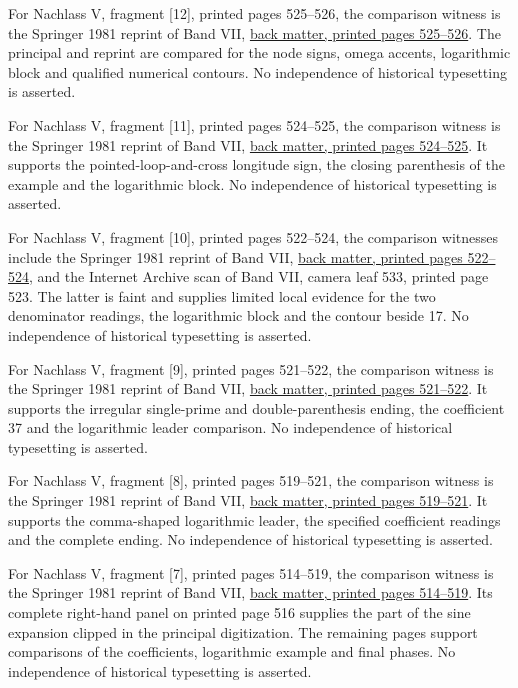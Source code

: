 For Nachlass V, fragment [12], printed pages 525–526, the comparison witness is the Springer 1981 reprint of Band VII, \href{https://link.springer.com/content/pdf/bbm:978-3-642-92478-1/1}{back matter, printed pages 525–526}. The principal and reprint are compared for the node signs, omega accents, logarithmic block and qualified numerical contours. No independence of historical typesetting is asserted.



For Nachlass V, fragment [11], printed pages 524–525, the comparison witness is the Springer 1981 reprint of Band VII, \href{https://link.springer.com/content/pdf/bbm:978-3-642-92478-1/1}{back matter, printed pages 524–525}. It supports the pointed-loop-and-cross longitude sign, the closing parenthesis of the example and the logarithmic block. No independence of historical typesetting is asserted.



For Nachlass V, fragment [10], printed pages 522–524, the comparison witnesses include the Springer 1981 reprint of Band VII, \href{https://link.springer.com/content/pdf/bbm:978-3-642-92478-1/1}{back matter, printed pages 522–524}, and the Internet Archive scan of Band VII, camera leaf 533, printed page 523. The latter is faint and supplies limited local evidence for the two denominator readings, the logarithmic block and the contour beside 17. No independence of historical typesetting is asserted.



For Nachlass V, fragment [9], printed pages 521–522, the comparison witness is the Springer 1981 reprint of Band VII, \href{https://link.springer.com/content/pdf/bbm:978-3-642-92478-1/1}{back matter, printed pages 521–522}. It supports the irregular single-prime and double-parenthesis ending, the coefficient 37 and the logarithmic leader comparison. No independence of historical typesetting is asserted.



For Nachlass V, fragment [8], printed pages 519–521, the comparison witness is the Springer 1981 reprint of Band VII, \href{https://link.springer.com/content/pdf/bbm:978-3-642-92478-1/1}{back matter, printed pages 519–521}. It supports the comma-shaped logarithmic leader, the specified coefficient readings and the complete ending. No independence of historical typesetting is asserted.



For Nachlass V, fragment [7], printed pages 514–519, the comparison witness is the Springer 1981 reprint of Band VII, \href{https://link.springer.com/content/pdf/bbm:978-3-642-92478-1/1}{back matter, printed pages 514–519}. Its complete right-hand panel on printed page 516 supplies the part of the sine expansion clipped in the principal digitization. The remaining pages support comparisons of the coefficients, logarithmic example and final phases. No independence of historical typesetting is asserted.



